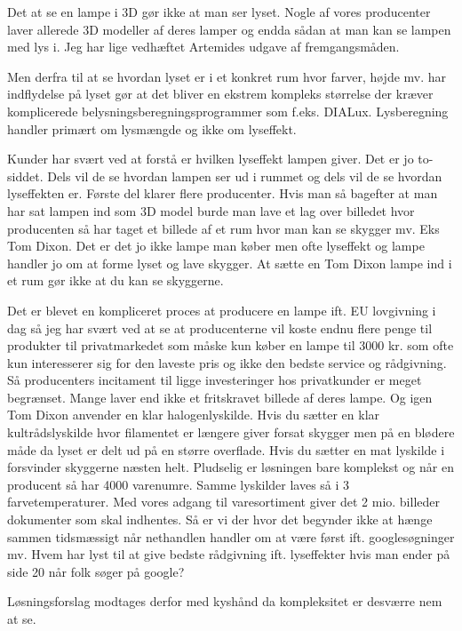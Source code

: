 \documentclass[oneside,a4paper,titlepage]{article}
\begin{document}
\begin{itemize}
Det at se en lampe i 3D gør ikke at man ser lyset. Nogle af vores producenter laver allerede 3D modeller af deres lamper og endda sådan at man kan se lampen med lys i. Jeg har lige vedhæftet Artemides udgave af fremgangsmåden.

Men derfra til at se hvordan lyset er i et konkret rum hvor farver, højde mv. har indflydelse på lyset gør at det bliver en ekstrem kompleks størrelse der kræver komplicerede belysningsberegningsprogrammer som f.eks. DIALux. Lysberegning handler primært om lysmængde og ikke om lyseffekt.

Kunder har svært ved at forstå er hvilken lyseffekt lampen giver. Det er jo to-siddet. Dels vil de se hvordan lampen ser ud i rummet og dels vil de se hvordan lyseffekten er. Første del klarer flere producenter. Hvis man så bagefter at man har sat lampen ind som 3D model burde man lave et lag over billedet hvor producenten så har taget et billede af et rum hvor man kan se skygger mv. Eks Tom Dixon. Det er det jo ikke lampe man køber men ofte lyseffekt og lampe handler jo om at forme lyset og lave skygger. At sætte en Tom Dixon lampe ind i et rum gør ikke at du kan se skyggerne.

Det er blevet en kompliceret proces at producere en lampe ift. EU lovgivning i dag så jeg har svært ved at se at producenterne vil koste endnu flere penge til produkter til privatmarkedet som måske kun køber en lampe til 3000 kr. som ofte kun interesserer sig for den laveste pris og ikke den bedste service og rådgivning. Så producenters incitament til ligge investeringer hos privatkunder er meget begrænset. Mange laver end ikke et fritskravet billede af deres lampe. Og igen Tom Dixon anvender en klar halogenlyskilde. Hvis du sætter en klar kultrådslyskilde hvor filamentet er længere giver forsat skygger men på en blødere måde da lyset er delt ud på en større overflade. Hvis du sætter en mat lyskilde i forsvinder skyggerne næsten helt. Pludselig er løsningen bare komplekst og når en producent så har 4000 varenumre. Samme lyskilder laves så i 3 farvetemperaturer. Med vores adgang til varesortiment giver det 2 mio. billeder dokumenter som skal indhentes. Så er vi der hvor det begynder ikke at hænge sammen tidsmæssigt når nethandlen handler om at være først ift. googlesøgninger mv. Hvem har lyst til at give bedste rådgivning ift. lyseffekter hvis man ender på side 20 når folk søger på google?  

Løsningsforslag modtages derfor med kyshånd da kompleksitet er desværre nem at se. 


\end{itemize}
\end{document}
